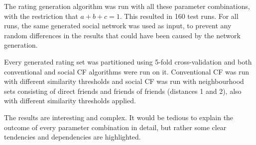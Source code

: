 The rating generation algorithm was run with all these parameter combinations, with the restriction that $a+b+c=1$. This resulted in 160 test runs. For all runs, the same generated social network was used as input, to prevent any random differences in the results that could have been caused by the network generation.

Every generated rating set was partitioned using 5-fold cross-validation and both conventional and social CF algorithms were run on it. Conventional CF was run with different similarity thresholds and social CF was run with neighbourhood sets consisting of direct friends and friends of friends (distances 1 and 2), also with different similarity thresholds applied.
\newline

The results are interesting and complex. It would be tedious to explain the outcome of every parameter combination in detail, but rather some clear tendencies and dependencies are highlighted.

